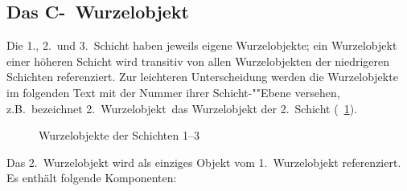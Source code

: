 \subsection{Das C-\protect\plob\ Wurzelobjekt}
%
Die 1., 2.\ und 3.~Schicht haben jeweils eigene Wurzelobjekte; ein
Wurzelobjekt einer h\"{o}heren Schicht wird transitiv von allen
Wurzelobjekten der niedrigeren Schichten referenziert. Zur leichteren
Unterscheidung werden die Wurzelobjekte im folgenden Text mit der
Nummer ihrer Schicht-""Ebe\-ne versehen,
z.B.\ bezeichnet \rglq{}2.~Wurzelobjekt\rgrq\ das Wurzelobjekt der
2.\ Schicht (\figurename\ \ref{fig:plroots}).%
%
\begin{figure}[htbp]%
\ifbuch%
\centerline{}%
\else%
\centerline{}%
\fi%
\caption{Wurzelobjekte der Schichten 1--3}%
\label{fig:plroots}%
\end{figure}%
%
\par{}Das 2.~Wurzelobjekt wird als einziges Objekt vom 1.~Wurzelobjekt
referenziert. Es enth\"{a}lt folgende Komponenten:
